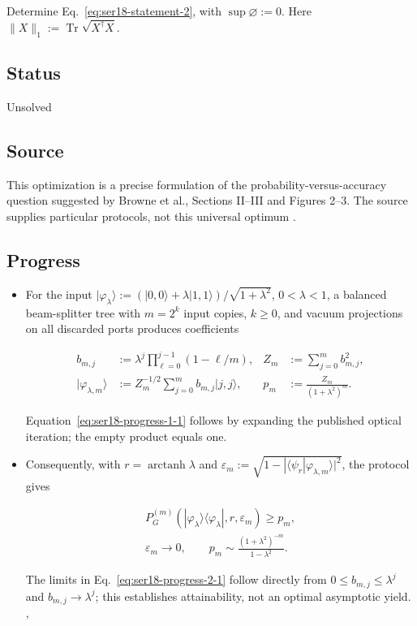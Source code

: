 Determine Eq.~\eqref{eq:ser18-statement-2}, with $\sup\varnothing:=0$. Here $\|X\|_1:=\operatorname{Tr}\sqrt{X^\dagger X}$.

\subsection*{Status}

Unsolved

\subsection*{Source}

This optimization is a precise formulation of the probability-versus-accuracy question suggested by Browne et al., Sections II--III and Figures 2--3. The source supplies particular protocols, not this universal optimum .

\subsection*{Progress}

\begin{itemize}
  \item For the input $|\varphi_\lambda\rangle:=(|0,0\rangle+\lambda|1,1\rangle)/\sqrt{1+\lambda^2}$, $0<\lambda<1$, a balanced beam-splitter tree with $m=2^k$ input copies, $k\geq0$, and vacuum projections on all discarded ports produces coefficients

\begin{equation}
\begin{aligned}
b_{m,j}&:=\lambda^j\prod_{\ell=0}^{j-1}(1-\ell/m),
&Z_m&:=\sum_{j=0}^{m}b_{m,j}^2,\\
|\varphi_{\lambda,m}\rangle&:=Z_m^{-1/2}
\sum_{j=0}^{m}b_{m,j}|j,j\rangle,
&p_m&:=\frac{Z_m}{(1+\lambda^2)^m}.
\end{aligned}
\label{eq:ser18-progress-1-1}
\end{equation}

Equation~\eqref{eq:ser18-progress-1-1} follows by expanding the published optical iteration; the empty product equals one. 

  \item Consequently, with $r=\operatorname{arctanh}\lambda$ and $\varepsilon_m:=\sqrt{1-|\langle\psi_r|\varphi_{\lambda,m}\rangle|^2}$, the protocol gives

\begin{equation}
\begin{gathered}
P_G^{(m)}(|\varphi_\lambda\rangle\langle\varphi_\lambda|,r,\varepsilon_m)\geq p_m,
\\ \varepsilon_m\longrightarrow0,\qquad
p_m\sim\frac{(1+\lambda^2)^{-m}}{1-\lambda^2}.
\end{gathered}
\label{eq:ser18-progress-2-1}
\end{equation}

The limits in Eq.~\eqref{eq:ser18-progress-2-1} follow directly from $0\leq b_{m,j}\leq\lambda^j$ and $b_{m,j}\to\lambda^j$; this establishes attainability, not an optimal asymptotic yield. , 
\end{itemize}

